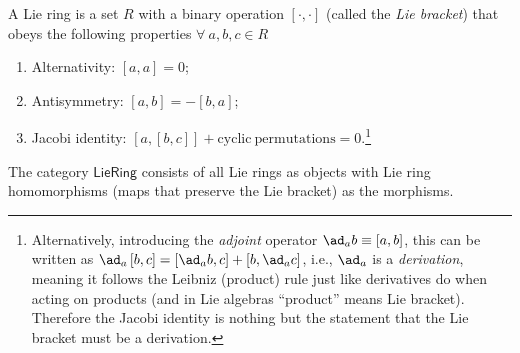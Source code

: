 \begin{defn}
    A Lie ring is a set $R$ with a binary operation $[\cdot,\cdot]$
    (called the \emph{Lie bracket}) that obeys the following properties
    $\forall~a,b,c\in R$ 
    \begin{enumerate}
    \item Alternativity: $[a,a]=0$;
    \item Antisymmetry: $[a,b]=-[b,a]$; 
    \item Jacobi identity: $[a,[b,c]]+\mathrm{cyclic~permutations}=0$.\footnote{Alternatively, introducing the \emph{adjoint} operator $\ad_{a}b\equiv\left[a,b\right]$,
    this can be written as $\ad_{a}\left[b,c\right]=\left[\ad_{a}b,c\right]+\left[b,\ad_{a}c\right]$,
    i.e., $\ad_{a}$ is a \emph{derivation}, meaning
    it follows the Leibniz (product) rule just like derivatives do when
    acting on products (and in Lie algebras ``product'' means Lie bracket).
    Therefore the Jacobi identity is nothing but the statement that the
    Lie bracket must be a derivation.}
    \end{enumerate}
    The category $\mathsf{LieRing}$ consists of all Lie rings as objects
    with Lie ring homomorphisms (maps that preserve the Lie bracket) as
    the morphisms.
\end{defn}

